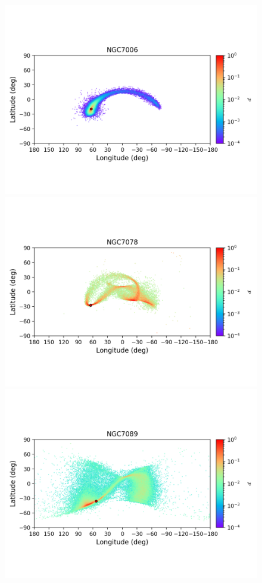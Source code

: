 \begin{figure}
        \includegraphics[clip=true, trim = 0mm 20mm 0mm 10mm, width=1\columnwidth]{images/error_plots_NGC7006.png}
        \includegraphics[clip=true, trim = 0mm 20mm 0mm 10mm, width=1\columnwidth]{images/error_plots_NGC7078.png}
        \includegraphics[clip=true, trim = 0mm 20mm 0mm 10mm, width=1\columnwidth]{images/error_plots_NGC7089.png}

\end{figure}
